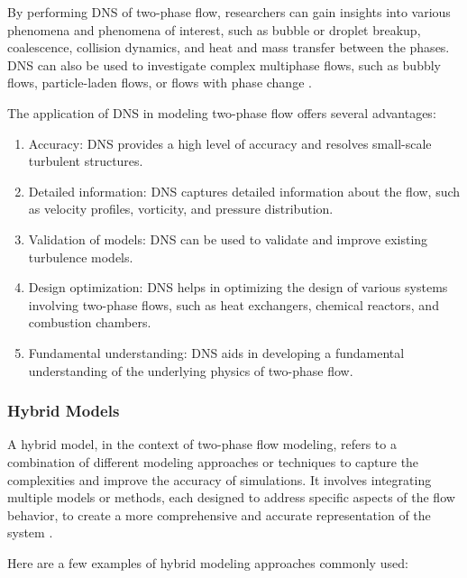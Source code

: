 		By performing DNS of two-phase flow, researchers can gain insights into various phenomena and phenomena of interest, such as bubble or droplet breakup, coalescence, collision dynamics, and heat and mass transfer between the phases. DNS can also be used to investigate complex multiphase flows, such as bubbly flows, particle-laden flows, or flows with phase change \cite{chen1998lattice}.
		
		The application of DNS in modeling two-phase flow offers several advantages:
		
		\begin{enumerate}
			\item Accuracy: DNS provides a high level of accuracy and resolves small-scale turbulent structures.
			
			\item Detailed information: DNS captures detailed information about the flow, such as velocity profiles, vorticity, and pressure distribution.
			
			\item Validation of models: DNS can be used to validate and improve existing turbulence models.
			
			\item Design optimization: DNS helps in optimizing the design of various systems involving two-phase flows, such as heat exchangers, chemical reactors, and combustion chambers.
			
			\item Fundamental understanding: DNS aids in developing a fundamental understanding of the underlying physics of two-phase flow.
			
		\end{enumerate}
	
	\subsubsection{Hybrid Models}
		A hybrid model, in the context of two-phase flow modeling, refers to a combination of different modeling approaches or techniques to capture the complexities and improve the accuracy of simulations. It involves integrating multiple models or methods, each designed to address specific aspects of the flow behavior, to create a more comprehensive and accurate representation of the system \cite{rabbani2018pore}.

		Here are a few examples of hybrid modeling approaches commonly used:
		
